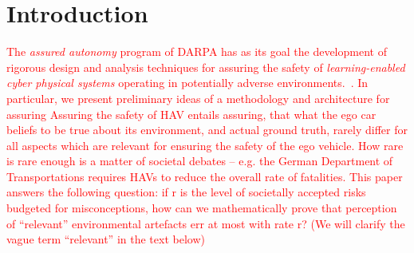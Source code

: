 \section{Introduction}
\textcolor{red}{The \emph{assured autonomy} program of DARPA has as its goal the development of rigorous design and analysis techniques for assuring the safety of \emph{learning-enabled cyber physical systems} operating in potentially adverse environments.~\cite{AssuredAutonomy}. In particular, we present preliminary ideas of a methodology and architecture for assuring 
Assuring the safety of HAV entails assuring, that what the ego car beliefs to be true about its environment, and actual ground truth, rarely differ for all aspects which are relevant for ensuring the safety of the ego vehicle. How rare is rare enough is a matter of societal debates -- e.g. the German Department of Transportations requires HAVs to reduce the overall rate of fatalities. This paper answers the following question: if  r  is the level of societally accepted risks budgeted for misconceptions, how can we mathematically prove that perception of \enquote{relevant} environmental artefacts err at most with rate r? (We will clarify the vague term \enquote{relevant} in the text below)

}
